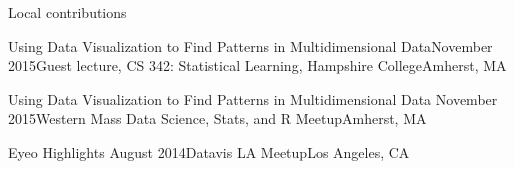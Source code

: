 \documentclass{resume} %
\begin{document}
\begin{rSection}{Local contributions}
\begin{sSubsection}{Using Data Visualization to Find Patterns in Multidimensional Data}{}{November 2015}{Guest lecture, CS 342: Statistical Learning, Hampshire College}{Amherst, MA}
\end{sSubsection}

\begin{sSubsection}{Using Data Visualization to Find Patterns in Multidimensional Data}{ }{November 2015}{Western Mass Data Science, Stats, and R Meetup}{Amherst, MA}
\end{sSubsection}

\begin{sSubsection}{Eyeo Highlights}{ }{August 2014}{Datavis LA Meetup}{Los Angeles, CA}
\end{sSubsection}

\end{rSection}
\end{document}
